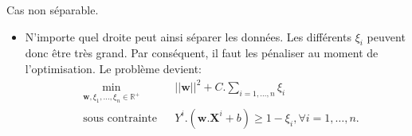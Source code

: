 \documentclass[8pt]{beamer}
\begin{document}
\begin{frame}{Cas non séparable.}
\begin{itemize}
				\item<9->  N'importe quel droite peut ainsi séparer les données. Les différents $\xi_i$ peuvent donc être très grand. Par conséquent, il faut les pénaliser au moment de l'optimisation. Le problème devient:
					\begin{equation}
						\begin{aligned}
						& \min_{\textbf{w}, \xi_1,\dots,\xi_n \in \mathbb{R}^+}
						& & {\vert\vert \textbf{w} \vert\vert}^2 + C.\sum_{i=1,\dots,n}\xi_i\\
						& \text{sous contrainte}
						& & Y^i.(\textbf{w}.\textbf{X}^i + b) \geq 1 - \xi_i , \forall i = 1, \dots, n.
						\end{aligned}
					\end{equation}
			\end{itemize}
		\end{frame}
\end{document}
